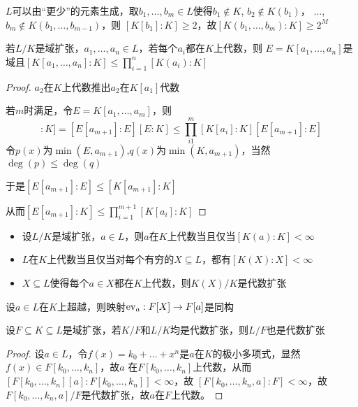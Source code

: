 \documentclass[11pt]{article}
\begin{document}
\begin{remark}
\(L\)可以由“更少”的元素生成，取\(b_1,\dots,b_m\in L\)使得\(b_1\notin K\), \(b_2\notin K(b_1)\)，
\(\dots\), \(b_m\notin K(b_1,\dots,b_{m-1})\)，则
\([K[b_1]:K]\ge 2\)，故\([K(b_1,\dots,b_m):K]\ge 2^M\)
\end{remark}

\begin{lemma}[]
若\(L/K\)是域扩张，\(a_1,\dots,a_n\in L\)，若每个\(a_i\)都在\(K\)上代数，则
\(E=K[a_1,\dots,a_n]\)是域且\([K[a_1,\dots,a_n]:K]\le\prod_{i=1}^n[K(a_i):K]\)
\end{lemma}

\begin{proof}
\(a_2\)在\(K\)上代数推出\(a_2\)在\(K[a_1]\)代数

若\(m\)时满足，令\(E=K[a_1,\dots,a_m]\)，则
\begin{equation*}
[E[a_{m+1}]:K]=[E[a_{m+1}]:E][E:K]\le\prod_{i1}^m[K[a_i]:K][E[a_{m+1}]:E]
\end{equation*}
令\(p(x)\)为\(\min(E,a_{m+1})\),\(q(x)\)为\(\min(K,a_{m+1})\)，当然\(\deg(p)\le\deg(q)\)

于是\([E[a_{m+1}]:E]\le[K[a_{m+1}]:K]\)

从而\([E[a_{m+1}]:K]\le\prod_{i=1}^{m+1}[K[a_i]:K]\)
\end{proof}

\begin{corollary}[]
\begin{itemize}
\item 设\(L/K\)是域扩张，\(a\in L\)，则\(a\)在\(K\)上代数当且仅当\([K(a):K]<\infty\)
\item \(L\)在\(K\)上代数当且仅当对每个有穷的\(X\subseteq L\)，都有\([K(X):X]<\infty\)
\item \(X\subseteq L\)使得每个\(a\in X\)都在\(K\)上代数，则\(K(X)/K\)是代数扩张
\end{itemize}
\end{corollary}

\begin{remark}
设\(a\in L\)在\(K\)上超越，则映射\(\operatorname{ev}_a:F[X]\to F[a]\)是同构
\end{remark}

\begin{proposition}[]
设\(F\subseteq K\subseteq L\)是域扩张，若\(K/F\)和\(L/K\)均是代数扩张，则\(L/F\)也是代数扩张
\end{proposition}

\begin{proof}
设\(a\in L\)，令\(f(x)=k_0+\dots+x^n\)是\(a\)在\(K\)的极小多项式，显然\(f(x)\in F[k_0,\dots,k_n]\)，故\(a\)
在\(F[k_0,\dots,k_n]\)上代数，从而\([F[k_0,\dots,k_n][a]:F[k_0,\dots,k_n]]<\infty\)，故
\([F[k_0,\dots,k_n,a]:F]<\infty\)，故\(F[k_0,\dots,k_n,a]/F\)是代数扩张，故\(a\)在\(F\)上代数。
\end{proof}
\end{document}
